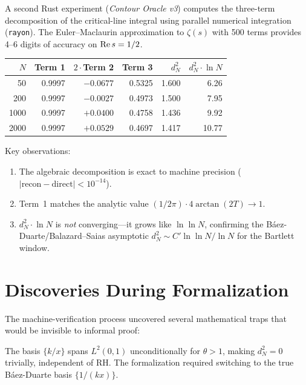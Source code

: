 \documentclass[11pt,a4paper]{article}
\begin{document}
A second Rust experiment (\emph{Contour Oracle v3}) computes the three-term
decomposition of the critical-line integral using parallel numerical
integration (\texttt{rayon}). The Euler--Maclaurin approximation to
$\zeta(s)$ with 500 terms provides 4--6 digits of accuracy on $\operatorname{Re} s = 1/2$.

\begin{center}
\begin{tabular}{@{}rrrrrr@{}}
\toprule
$N$ & Term 1 & $2\cdot$Term 2 & Term 3 & $d_N^2$ & $d_N^2 \cdot \ln N$ \\
\midrule
50  & 0.9997 & $-0.0677$ & 0.5325 & 1.600 & 6.26  \\
200 & 0.9997 & $-0.0027$ & 0.4973 & 1.500 & 7.95  \\
1000 & 0.9997 & $+0.0400$ & 0.4758 & 1.436 & 9.92 \\
2000 & 0.9997 & $+0.0529$ & 0.4697 & 1.417 & 10.77 \\
\bottomrule
\end{tabular}
\end{center}

\noindent Key observations:
\begin{enumerate}
  \item The algebraic decomposition is exact to machine precision
    ($|\text{recon} - \text{direct}| < 10^{-14}$).
  \item Term~1 matches the analytic value
    $(1/2\pi)\cdot 4\arctan(2T) \to 1$.
  \item $d_N^2 \cdot \ln N$ is \emph{not} converging---it grows like
    $\ln\ln N$, confirming the B\'aez-Duarte/Balazard--Saias asymptotic
    $d_N^2 \sim C' \ln\ln N / \ln N$ for the Bartlett window.
\end{enumerate}

\section{Discoveries During Formalization}

The machine-verification process uncovered several mathematical traps
that would be invisible to informal proof:

\begin{discovery}
The basis $\{k/x\}$ spans $L^2(0,1)$ unconditionally for $\theta > 1$,
making $d_N^2 = 0$ trivially, independent of RH. The formalization
required switching to the true B\'aez-Duarte basis $\{1/(kx)\}$.
\end{discovery}
\end{document}
